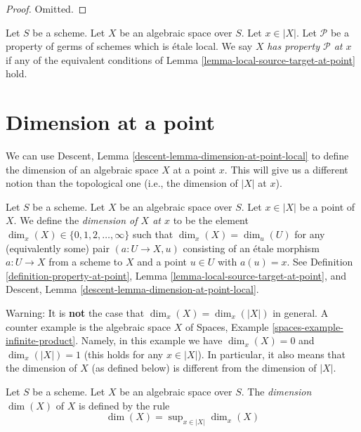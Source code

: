 \begin{proof}
Omitted.
\end{proof}

\begin{definition}
\label{definition-property-at-point}
Let $S$ be a scheme. Let $X$ be an algebraic space over $S$.
Let $x \in |X|$. Let $\mathcal{P}$ be a property of germs of schemes which is 
\'etale local.
We say $X$ {\it has property $\mathcal{P}$ at $x$} if any of the
equivalent conditions of
Lemma \ref{lemma-local-source-target-at-point}
hold.
\end{definition}





\section{Dimension at a point}
\label{section-dimension}

\noindent
We can use
Descent, Lemma \ref{descent-lemma-dimension-at-point-local}
to define the dimension of an algebraic
space $X$ at a point $x$. This will give us a different notion than the
topological one (i.e., the dimension of $|X|$ at $x$).

\begin{definition}
\label{definition-dimension-at-point}
Let $S$ be a scheme.
Let $X$ be an algebraic space over $S$.
Let $x \in |X|$ be a point of $X$.
We define the {\it dimension of $X$ at $x$} to be
the element $\dim_x(X) \in \{0, 1, 2, \ldots, \infty\}$
such that $\dim_x(X) = \dim_u(U)$ for any (equivalently some)
pair $(a : U \to X, u)$ consisting of an \'etale morphism $a : U \to X$
from a scheme to $X$ and a point $u \in U$ with $a(u) = x$.
See
Definition \ref{definition-property-at-point},
Lemma \ref{lemma-local-source-target-at-point}, and
Descent, Lemma \ref{descent-lemma-dimension-at-point-local}.
\end{definition}

\noindent
Warning: It is {\bf not} the case that $\dim_x(X) = \dim_x(|X|)$
in general. A counter example is the algebraic space $X$ of
Spaces, Example \ref{spaces-example-infinite-product}.
Namely, in this example we have $\dim_x(X) = 0$ and
$\dim_x(|X|) = 1$ (this holds for any $x \in |X|$).
In particular, it also means that the dimension of $X$ (as defined
below) is different from the dimension of $|X|$.

\begin{definition}
\label{definition-dimension}
Let $S$ be a scheme. Let $X$ be an algebraic space over $S$.
The {\it dimension} $\dim(X)$ of $X$ is defined by the rule
$$
\dim(X) = \sup\nolimits_{x \in |X|} \dim_x(X)
$$
\end{definition}


